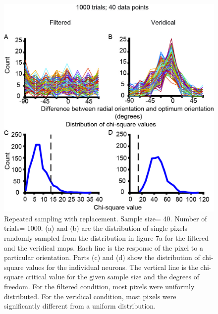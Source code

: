 				\begin{figure}
					
					\includegraphics[width=\linewidth]{rb/S3.jpg}
					\caption{Repeated sampling with replacement. Sample size= 40. Number of trials= 1000. (a) and (b) are the distribution of single pixels randomly sampled from the distribution in figure 7a for the filtered and the veridical maps. Each line is the response of the pixel to a particular orientation. Parts (c) and (d) show the distribution of chi-square values for the individual neurons. The vertical line is the chi-square critical value for the given sample size and the degrees of freedom. For the filtered condition, most pixels were uniformly distributed. For the veridical condition, most pixels were significantly different from a uniform distribution.}
					\label{fig:fig8}
				\end{figure}
				
